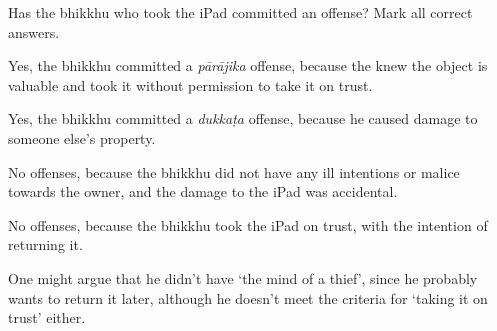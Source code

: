 \begin{exam}{\autoExamName}
\begin{problem}
  \bigskip

  Has the bhikkhu who took the iPad committed an offense? Mark all correct answers.

  \ifnosolutions
  \bigskip
  \else
  \clearpage
  \fi

  \begin{manswers}{1}
    \bChoices

     Yes, the bhikkhu committed a \emph{pārājika} offense, because the knew the object is valuable and took it without permission to take it on trust. \eAns

     Yes, the bhikkhu committed a \emph{dukkaṭa} offense, because he caused damage to someone else's property. \eAns

     No offenses, because the bhikkhu did not have any ill intentions or malice towards the owner, and the damage to the iPad was accidental. \eAns

     No offenses, because the bhikkhu took the iPad on trust, with the intention of returning it. \eAns

    \eChoices
  \end{manswers}

  \begin{solution}
    One might argue that he didn't have `the mind of a thief', since he probably wants to return it later,
    although he doesn't meet the criteria for `taking it on trust' either.
  \end{solution}

\end{problem}

\end{exam}
